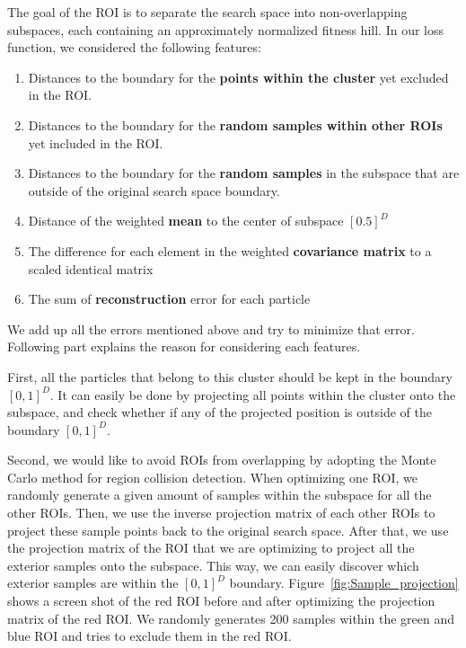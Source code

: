 The goal of the ROI is to separate the search space into non-overlapping subspaces, 
each containing an approximately normalized fitness hill.
In our loss function, we considered the following features:
\begin{enumerate}
    \item Distances to the boundary for the \textbf{points within the cluster} yet excluded in the ROI.
    \item Distances to the boundary for the \textbf{random samples within other ROIs} yet included in the ROI.
    \item Distances to the boundary for the \textbf{random samples} in the subspace that are outside of the original search space boundary.
    \item Distance of the weighted \textbf{mean} to the center of subspace $[0.5]^D$
    \item The difference for each element in the weighted \textbf{covariance matrix} to a scaled identical matrix
    \item The sum of \textbf{reconstruction} error for each particle 
\end{enumerate} 
We add up all the errors mentioned above and try to minimize that error. 
Following part explains the reason for considering each features.

First, all the particles that belong to this cluster should be kept in the boundary $[0,1]^D$.
It can easily be done by projecting all points within the cluster onto the subspace, 
and check whether if any of the projected position is outside of the boundary $[0,1]^D$.

Second, we would like to avoid ROIs from overlapping by adopting the Monte Carlo method for region collision detection. 
When optimizing one ROI, we randomly generate a given amount of samples within the subspace for all the other ROIs.
Then, we use the inverse projection matrix of each other ROIs to project these sample points back to the original search space.
After that, we use the projection matrix of the ROI that we are optimizing to project all the exterior samples onto the subspace.
This way, we can easily discover which exterior samples are within the $[0, 1]^D$ boundary.
Figure~\ref{fig:Sample_projection} shows a screen shot of the red ROI before and after optimizing the projection matrix of the red ROI.
We randomly generates 200 samples within the green and blue ROI and tries to exclude them in the red ROI.

